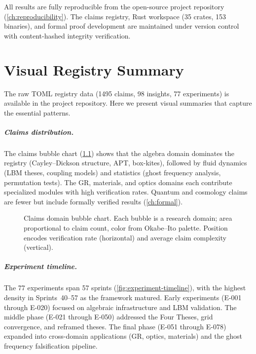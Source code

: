 \documentclass[12pt,openany]{report}
\theoremstyle{definition}
\theoremstyle{plain}
\theoremstyle{remark}
\newcommand{\claimcount}{1495}
\newcommand{\binarycount}{153}
\newcommand{\cratecount}{35}
\begin{document}
All results are fully reproducible from the open-source project
repository (\cref{ch:reproducibility}).  The claims registry, Rust
workspace (\cratecount{} crates, \binarycount{} binaries), and formal
proof development are maintained under version control with
content-hashed integrity verification.


\appendix

\chapter{Visual Registry Summary}
\label{ch:registry-summary}

The raw TOML registry data (\claimcount{} claims, 98 insights, 77
experiments) is available in the project repository.  Here we present
visual summaries that capture the essential patterns.

\paragraph{Claims distribution.}
The claims bubble chart (\cref{fig:claims-bubble}) shows that the
algebra domain dominates the registry (Cayley--Dickson structure, APT,
box-kites), followed by fluid dynamics (LBM theses, coupling models)
and statistics (ghost frequency analysis, permutation tests).
The GR, materials, and optics domains each contribute specialized
modules with high verification rates.  Quantum and cosmology claims
are fewer but include formally verified results
(\cref{ch:formal}).

\begin{figure}[htbp]
\centering

\caption{Claims domain bubble chart.  Each bubble is a research domain;
area proportional to claim count, color from Okabe--Ito palette.
Position encodes verification rate (horizontal) and average claim
complexity (vertical).}
\label{fig:claims-bubble}
\end{figure}

\paragraph{Experiment timeline.}
The 77 experiments span 57 sprints (\cref{fig:experiment-timeline}),
with the highest density in Sprints~40--57 as the framework matured.
Early experiments (E-001 through E-020) focused on algebraic
infrastructure and LBM validation.  The middle phase (E-021 through
E-050) addressed the Four Theses, grid convergence, and reframed
theses.  The final phase (E-051 through E-078) expanded into
cross-domain applications (GR, optics, materials) and the ghost
frequency falsification pipeline.
\end{document}
